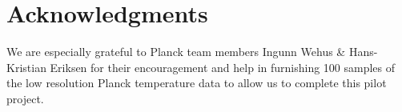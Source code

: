 \documentclass[useAMS,usenatbib,a4paper]{mn2e}
\begin{document}

\section*{Acknowledgments}

We are especially grateful to Planck team members Ingunn Wehus \&
Hans-Kristian Eriksen for their encouragement and help in furnishing
100 samples of the low resolution Planck temperature data to allow us
to complete this pilot project.



\end{document}
